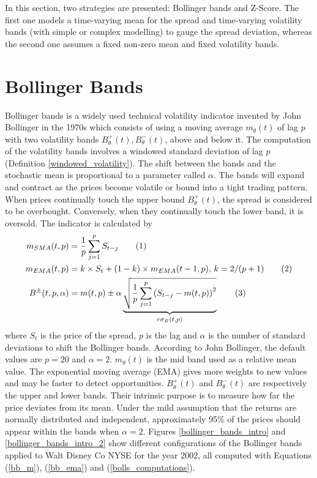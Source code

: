 \documentclass[11pt,a4,twosided,singlespacing,titlepagenumber=on]{scrreprt}
\numberwithin{equation}{chapter} %
\theoremstyle{remark}
\newcommand\numberthis{\addtocounter{equation}{1}\tag{\theequation}}
\begin{document}
In this section, two strategies are presented: Bollinger bands and Z-Score. The first one models a time-varying mean for the spread and time-varying volatility bands (with simple or complex modelling) to gauge the spread deviation, whereas the second one assumes a fixed non-zero mean and fixed volatility bands.

\section{Bollinger Bands}
\label{sec:bollinger_bands}
Bollinger bands is a widely used technical volatility indicator invented by John Bollinger in the 1970s which consists of using a moving average $m_\theta(t)$ of lag $p$ with two volatility bands $B_\theta^+(t), B_\theta^-(t)$, above and below it. The computation of the volatility bands involves a windowed standard deviation of lag $p$ (Definition \ref{windowed_volatility}). The shift between the bands and the stochastic mean is proportional to a parameter called $\alpha$. The bands will expand and contract as the prices become volatile or bound into a tight trading pattern. When prices continually touch the upper bound $B_\theta^+(t)$, the spread is considered to be overbought. Conversely, when they continually touch the lower band, it is oversold. The indicator is calculated by
\begin{align*}
m_{SMA}(t,p) &= \frac{1}{p}\sum_{j=1}^p S_{t-j} \numberthis \label{bb_m} \\
m_{EMA}(t,p) &= k \times S_t + (1-k) \times m_{EMA}(t-1,p) \text{, } k = 2/(p+1) \numberthis \label{bb_ema} \\
B^\pm(t,p,\alpha) &= m(t,p) \pm \alpha \underbrace{\sqrt{\frac{1}{p} \sum_{j=1}^p \left(S_{t-j} - m(t,p) \right)^2}}_{r\sigma_B(t,p)} \numberthis \label{bolls_computations}
\end{align*}
where $S_t$ is the price of the spread, $p$ is the lag and $\alpha$ is the number of standard deviations to shift the Bollinger bands. According to John Bollinger, the default values are $p = 20$ and $\alpha = 2$. $m_\theta(t)$ is the mid band used as a relative mean value. The exponential moving average (EMA) gives more weights to new values and may be faster to detect opportunities. $B^+_\theta(t)$ and $B^-_\theta(t)$ are respectively the upper and lower bands. Their intrinsic purpose is to measure how far the price deviates from its mean. Under the mild assumption that the returns are normally distributed and independent, approximately 95\% of the prices should appear within the bands when $\alpha = 2$. Figures \ref{bollinger_bands_intro} and \ref{bollinger_bands_intro_2} show different configurations of the Bollinger bands applied to Walt Disney Co NYSE for the year 2002, all computed with Equations (\ref{bb_m}), (\ref{bb_ema}) and (\ref{bolls_computations}).
\end{document}
